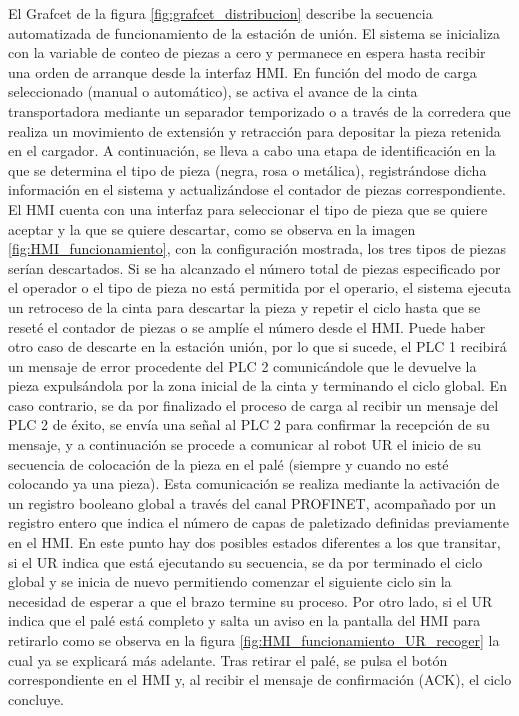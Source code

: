 El Grafcet de la figura \ref{fig:grafcet_distribucion} describe la secuencia automatizada de funcionamiento de la estación de unión. El sistema se inicializa con la variable de conteo de piezas a cero y permanece en espera hasta recibir una orden de arranque desde la interfaz HMI. En función del modo de carga seleccionado (manual o automático), se activa el avance de la cinta transportadora mediante un separador temporizado o a través de la corredera que realiza un movimiento de extensión y retracción para depositar la pieza retenida en el cargador. A continuación, se lleva a cabo una etapa de identificación en la que se determina el tipo de pieza (negra, rosa o metálica), registrándose dicha información en el sistema y actualizándose el contador de piezas correspondiente. El HMI cuenta con una interfaz para seleccionar el tipo de pieza que se quiere aceptar y la que se quiere descartar, como se observa en la imagen \ref{fig:HMI_funcionamiento}, con la configuración mostrada, los tres tipos de piezas serían descartados. Si se ha alcanzado el número total de piezas especificado por el operador o el tipo de pieza no está permitida por el operario, el sistema ejecuta un retroceso de la cinta para descartar la pieza y repetir el ciclo hasta que se reseté el contador de piezas o se amplíe el número desde el HMI. Puede haber otro caso de descarte en la estación unión, por lo que si sucede, el PLC 1 recibirá un mensaje de error procedente del PLC 2 comunicándole que le devuelve la pieza expulsándola por la zona inicial de la cinta y terminando el ciclo global. En caso contrario, se da por finalizado el proceso de carga al recibir un mensaje del PLC 2 de éxito, se envía una señal al PLC 2 para confirmar la recepción de su mensaje, y a continuación se procede a comunicar al robot UR el inicio de su secuencia de colocación de la pieza en el palé (siempre y cuando no esté colocando ya una pieza). Esta comunicación se realiza mediante la activación de un registro booleano global a través del canal PROFINET, acompañado por un registro entero que indica el número de capas de paletizado definidas previamente en el HMI. En este punto hay dos posibles estados diferentes a los que transitar, si el UR indica que está ejecutando su secuencia, se da por terminado el ciclo global y se inicia de nuevo permitiendo comenzar el siguiente ciclo sin la necesidad de esperar a que el brazo termine su proceso. Por otro lado, si el UR indica que el palé está completo y salta un aviso en la pantalla del HMI para retirarlo como se observa en la figura \ref{fig:HMI_funcionamiento_UR_recoger} la cual ya se explicará más adelante. Tras retirar el palé, se pulsa el botón correspondiente en el HMI y, al recibir el mensaje de confirmación (ACK), el ciclo concluye.


